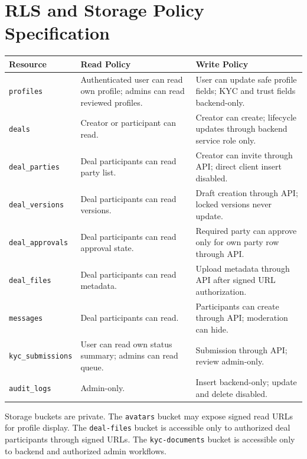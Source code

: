 \section{RLS and Storage Policy Specification}
\begin{longtable}{p{}p{}p{}}
\toprule
Resource & Read Policy & Write Policy \\
\midrule
\texttt{profiles} & Authenticated user can read own profile; admins can read reviewed profiles. & User can update safe profile fields; KYC and trust fields backend-only. \\
\texttt{deals} & Creator or participant can read. & Creator can create; lifecycle updates through backend service role only. \\
\texttt{deal\_parties} & Deal participants can read party list. & Creator can invite through API; direct client insert disabled. \\
\texttt{deal\_versions} & Deal participants can read versions. & Draft creation through API; locked versions never update. \\
\texttt{deal\_approvals} & Deal participants can read approval state. & Required party can approve only for own party row through API. \\
\texttt{deal\_files} & Deal participants can read metadata. & Upload metadata through API after signed URL authorization. \\
\texttt{messages} & Deal participants can read. & Participants can create through API; moderation can hide. \\
\texttt{kyc\_submissions} & User can read own status summary; admins can read queue. & Submission through API; review admin-only. \\
\texttt{audit\_logs} & Admin-only. & Insert backend-only; update and delete disabled. \\
\bottomrule
\end{longtable}

Storage buckets are private. The \texttt{avatars} bucket may expose signed read URLs for profile display. The \texttt{deal-files} bucket is accessible only to authorized deal participants through signed URLs. The \texttt{kyc-documents} bucket is accessible only to backend and authorized admin workflows.

